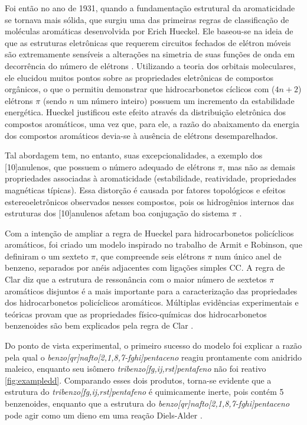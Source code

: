 Foi então no ano de 1931, quando a fundamentação estrutural da aromaticidade se tornava mais sólida, que surgiu uma das primeiras regras de classificação de moléculas aromáticas desenvolvida por Erich Hueckel\autocite{Hckel1931}. Ele baseou-se na ideia de que as estruturas eletrônicas que requerem circuitos fechados de elétron móveis são extremamente sensíveis a alterações na simetria de suas funções de onda em decorrência do número de elétrons \autocite{Hckel1931, Schleyer1996, Schleyer2001}. Utilizando a teoria dos orbitais moleculares, ele elucidou muitos pontos sobre as propriedades eletrônicas de compostos orgânicos, o que o permitiu demonstrar que hidrocarbonetos cíclicos com ($4n+2$) elétrons $\pi$ (sendo $n$ um número inteiro) possuem um incremento da estabilidade energética. Hueckel\autocite{Hckel1931, Brogli1972} justificou este efeito através da distribuição eletrônica dos compostos aromáticos, uma vez que, para ele, a razão do abaixamento da energia dos compostos aromáticos devia-se à ausência de elétrons desemparelhados.

Tal abordagem tem, no entanto, suas excepcionalidades, a exemplo dos [10]anulenos, que possuem o número adequado de elétrons $\pi$, mas não as demais propriedades associadas à aromaticidade (estabilidade, reatividade, propriedades magnéticas típicas). Essa distorção é causada por fatores topológicos e efeitos estereoeletrônicos observados nesses compostos, pois os hidrogênios internos das estruturas dos [10]anulenos afetam boa conjugação do sistema $\pi$ \autocite{Caramori2006}. 

Com a intenção de ampliar a regra de Hueckel para hidrocarbonetos policíclicos aromáticos, foi criado um modelo inspirado no trabalho de Armit e Robinson, que definiram o um sexteto $\pi$, que compreende seis elétrons $\pi$ num único anel de benzeno, separados por anéis adjacentes com ligações simples CC. A regra de Clar diz que a estrutura de ressonância com o maior número de sextetos $\pi$ aromáticos disjuntos é a mais importante para a caracterização das propriedades dos hidrocarbonetos policíclicos aromáticos. Múltiplas evidências experimentais e teóricas provam que as propriedades físico-químicas dos hidrocarbonetos benzenoides são bem explicados pela regra de Clar \autocite{Sola2013}. 

Do ponto de vista experimental, o primeiro sucesso do modelo foi explicar a razão pela qual o \textit{benzo[qr]nafto[2,1,8,7-fghi]pentaceno}
reagiu prontamente com anidrido maleico, enquanto seu isômero \textit{tribenzo[fg,ij,rst]pentafeno} não foi reativo \autoref{fig:exampledd}. Comparando esses dois produtos, torna-se evidente que a estrutura do \textit{tribenzo[fg,ij,rst]pentafeno} é quimicamente inerte, pois contém 5 benzenoides, enquanto que a estrutura do \textit{benzo[qr]nafto[2,1,8,7-fghi]pentaceno} pode agir como um dieno em uma reação Diels-Alder \autocite{Clar1958}.

